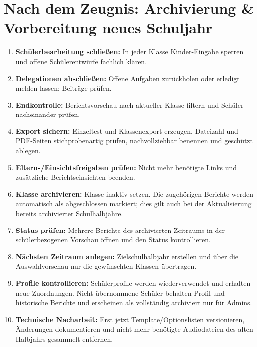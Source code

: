 \documentclass[12pt,a4paper]{article}
\begin{document}
\section{Nach dem Zeugnis: Archivierung \& Vorbereitung neues Schuljahr}\label{sec:jahreswechsel}
\begin{enumerate}
  \item \textbf{Schülerbearbeitung schließen:} In jeder Klasse Kinder-Eingabe sperren und offene Schülerentwürfe fachlich klären.
  \item \textbf{Delegationen abschließen:} Offene Aufgaben zurückholen oder erledigt melden lassen; Beiträge prüfen.
  \item \textbf{Endkontrolle:} Berichtsvorschau nach aktueller Klasse filtern und Schüler nacheinander prüfen.
  \item \textbf{Export sichern:} Einzeltest und Klassenexport erzeugen, Dateizahl und PDF-Seiten stichprobenartig prüfen, nachvollziehbar benennen und geschützt ablegen.
  \item \textbf{Eltern-/Einsichtsfreigaben prüfen:} Nicht mehr benötigte Links und zusätzliche Berichtseinsichten beenden.
  \item \textbf{Klasse archivieren:} Klasse inaktiv setzen. Die zugehörigen Berichte werden automatisch als abgeschlossen markiert; dies gilt auch bei der Aktualisierung bereits archivierter Schulhalbjahre.
  \item \textbf{Status prüfen:} Mehrere Berichte des archivierten Zeitraums in der schülerbezogenen Vorschau öffnen und den Status kontrollieren.
  \item \textbf{Nächsten Zeitraum anlegen:} Zielschulhalbjahr erstellen und über die Auswahlvorschau nur die gewünschten Klassen übertragen.
  \item \textbf{Profile kontrollieren:} Schülerprofile werden wiederverwendet und erhalten neue Zuordnungen. Nicht übernommene Schüler behalten Profil und historische Berichte und erscheinen als vollständig archiviert nur für Admins.
  \item \textbf{Technische Nacharbeit:} Erst jetzt Template/Optionslisten versionieren, Änderungen dokumentieren und nicht mehr benötigte Audiodateien des alten Halbjahrs gesammelt entfernen.
\end{enumerate}
\end{document}
